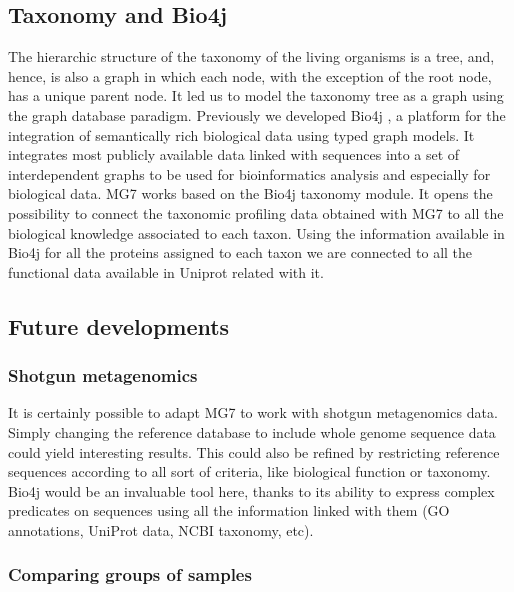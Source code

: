 \documentclass[fontsize=8pt,paper=a4,pagesize,abstracton]{scrartcl}
\begin{document}
\subsection{Taxonomy and Bio4j}\label{taxonomy-and-bio4j}

The hierarchic structure of the taxonomy of the living organisms is a
tree, and, hence, is also a graph in which each node, with the exception
of the root node, has a unique parent node. It led us to model the
taxonomy tree as a graph using the graph database paradigm. Previously
we developed Bio4j \autocite{pareja2015bio4j}, a platform for the
integration of semantically rich biological data using typed graph
models. It integrates most publicly available data linked with sequences
into a set of interdependent graphs to be used for bioinformatics
analysis and especially for biological data. MG7 works based on the
Bio4j taxonomy module. It opens the possibility to connect the taxonomic
profiling data obtained with MG7 to all the biological knowledge
associated to each taxon. Using the information available in Bio4j for
all the proteins assigned to each taxon we are connected to all the
functional data available in Uniprot related with it.

\subsection{Future developments}\label{future-developments}

\subsubsection{Shotgun metagenomics}\label{shotgun-metagenomics}

It is certainly possible to adapt MG7 to work with shotgun metagenomics
data. Simply changing the reference database to include whole genome
sequence data could yield interesting results. This could also be
refined by restricting reference sequences according to all sort of
criteria, like biological function or taxonomy. Bio4j would be an
invaluable tool here, thanks to its ability to express complex
predicates on sequences using all the information linked with them (GO
annotations, UniProt data, NCBI taxonomy, etc).

\subsubsection{Comparing groups of
samples}\label{comparing-groups-of-samples}
\end{document}
